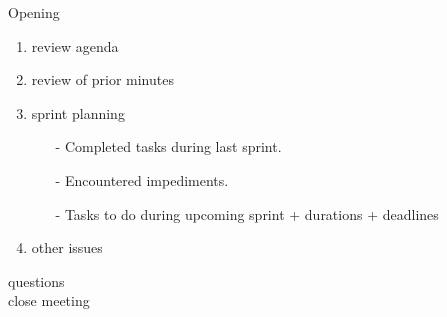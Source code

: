 \documentclass[pdftex, 12pt, a4paper]{report}
\begin{document}
\pagestyle{fancy}

Opening

\begin{enumerate}
\item review agenda			
\item review of prior minutes
\item sprint planning
\begin{enumerate}
\item[-] Completed tasks during last sprint.
\item[-] Encountered impediments.
\item[-] Tasks to do during upcoming sprint + durations + deadlines
\end{enumerate}
\item other issues
\end{enumerate}

questions\\

close meeting
\end{document}
